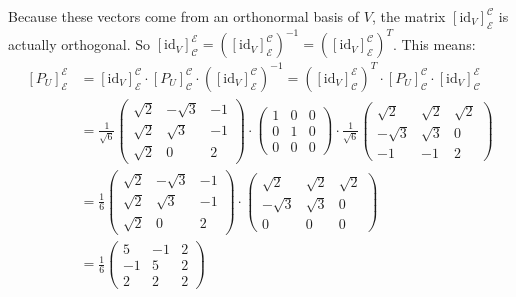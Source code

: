 \documentclass[12pt]{article}
\begin{document}
\begin{enumerate}[label=\alph*)]
    Because these vectors come from an orthonormal basis of $V$, the matrix $[\mathrm{id}_V]_{\mathcal{E}}^{\mathcal{C}}$ is actually orthogonal. So $[\mathrm{id}_V]_{\mathcal{C}}^{\mathcal{E}} = \left([\mathrm{id}_V]_{\mathcal{E}}^{\mathcal{C}}\right)^{-1} = \left([\mathrm{id}_V]_{\mathcal{E}}^{\mathcal{C}}\right)^T$. This means:
    $$
    \begin{aligned}
        [P_U]_{\mathcal{E}}^{\mathcal{E}} &= [\mathrm{id}_V]_{\mathcal{E}}^{\mathcal{C}}  \cdot [P_U]_{\mathcal{C}}^{\mathcal{C}}\cdot \left([\mathrm{id}_V]_{\mathcal{E}}^{\mathcal{C}}\right)^{-1} = \left([\mathrm{id}_V]_{\mathcal{C}}^{\mathcal{E}}\right)^T \cdot [P_U]_{\mathcal{C}}^{\mathcal{C}} \cdot [\mathrm{id}_V]_{\mathcal{C}}^{\mathcal{E}} \\
        &= 
        \frac{1}{\sqrt{6}} 
        \begin{pmatrix} 
            \sqrt{2} & -\sqrt{3} & -1 \\ 
            \sqrt{2} & \sqrt{3} & -1 \\ 
            \sqrt{2} & 0 & 2 
        \end{pmatrix}
         \cdot 
        \begin{pmatrix}
            1 & 0 & 0 \\
            0 & 1 & 0 \\
            0 & 0 & 0
        \end{pmatrix} \cdot
        \frac{1}{\sqrt{6}}
        \begin{pmatrix} 
            \sqrt{2} & \sqrt{2} & \sqrt{2} \\ 
            -\sqrt{3} & \sqrt{3} & 0 \\ 
            -1 & -1 & 2 
        \end{pmatrix} \\
        &= \frac{1}{6}
        \begin{pmatrix} 
            \sqrt{2} & -\sqrt{3} & -1 \\ 
            \sqrt{2} & \sqrt{3} & -1 \\ 
            \sqrt{2} & 0 & 2 
        \end{pmatrix} \cdot
        \begin{pmatrix}
            \sqrt{2} & \sqrt{2} & \sqrt{2} \\
            -\sqrt{3} & \sqrt{3} & 0 \\
            0 & 0 & 0
        \end{pmatrix} \\
        &= \boxed{\frac{1}{6}
        \begin{pmatrix}
            5 & -1 & 2 \\
            -1 & 5 & 2 \\
            2 & 2 & 2
        \end{pmatrix}}
    \end{aligned}
    $$


\end{enumerate}
\end{document}
